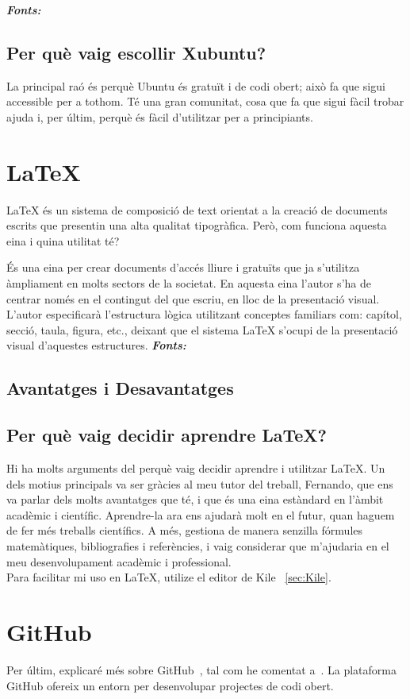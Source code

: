 \textit{\textbf{Fonts:}} \cite{GD}

\subsection{Per què vaig escollir Xubuntu?}
La principal raó és perquè Ubuntu és gratuït i de codi obert; això fa que sigui accessible per a tothom. Té una gran comunitat, cosa que fa que sigui fàcil trobar ajuda i, per últim, perquè és fàcil d’utilitzar per a principiants.

\section{LaTeX} \label{sec:latex}
LaTeX \cite{LaTeX} és un sistema de composició de text orientat a la creació de documents escrits que presentin una alta qualitat tipogràfica. Però, com funciona aquesta eina i quina utilitat té?

És una eina per crear documents d’accés lliure i gratuïts que ja s’utilitza àmpliament en molts sectors de la societat. En aquesta eina l’autor s’ha de centrar només en el contingut del que escriu, en lloc de la presentació visual. L’autor especificarà l’estructura lògica utilitzant conceptes familiars com: capítol, secció, taula, figura, etc., deixant que el sistema LaTeX s’ocupi de la presentació visual d’aquestes estructures.
\textit{\textbf{Fonts:}} \cite{CH}
\subsection{Avantatges i Desavantatges}
\subsection{Per què vaig decidir aprendre LaTeX?}
Hi ha molts arguments del perquè vaig decidir aprendre i utilitzar LaTeX. Un dels motius principals va ser gràcies al meu tutor del treball, Fernando, que ens va parlar dels molts avantatges que té, i que és una eina estàndard en l’àmbit acadèmic i científic. Aprendre-la ara ens ajudarà molt en el futur, quan haguem de fer més treballs científics. A més, gestiona de manera senzilla fórmules matemàtiques, bibliografies i referències, i vaig considerar que m’ajudaria en el meu desenvolupament acadèmic i professional.\\

Para facilitar mi uso en LaTeX, utilize el editor de Kile ~\ref{sec:Kile}.

\section{GitHub}
Per últim, explicaré més sobre GitHub~\cite{GitHub}, tal com he comentat a~. La plataforma GitHub ofereix un entorn per desenvolupar projectes de codi obert.

